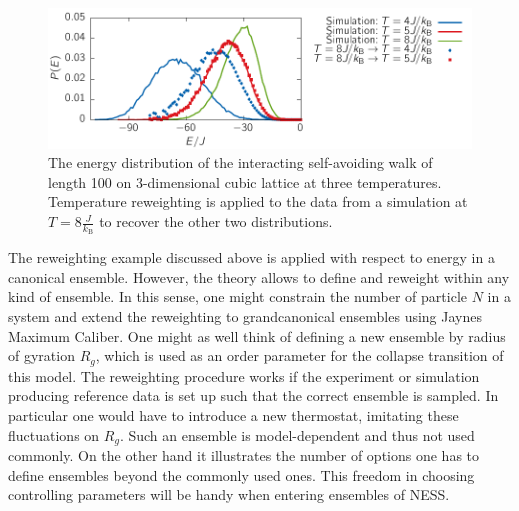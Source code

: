 \begin{figure}

 \includegraphics{../plots/Jaynes/ISAW.pdf}
 \caption[Equilibrium-reweighted energy distribution of the interacting self-avoiding walk.]{The energy distribution of the interacting self-avoiding walk of length 100 on 3-dimensional cubic lattice at three temperatures. Temperature reweighting is applied to the data from a simulation at $T = 8 \frac{J}{k_{\textrm{B}}}  $ to recover the other two distributions. 
 } \label{fig:ISAW}
\end{figure}

The reweighting example discussed above is applied with respect to energy in a canonical ensemble. However, the theory allows to define and reweight within any kind of ensemble. In this sense, one might constrain the number of particle $N$ in a system and extend the reweighting to grandcanonical ensembles using Jaynes Maximum Caliber. One might as well think of defining a new ensemble by radius of gyration $R_g$, which is used as an order parameter for the collapse transition of this model. The reweighting procedure works if the experiment or simulation producing reference data is set up such that the correct ensemble is sampled. In particular one would have to introduce a new thermostat, imitating these fluctuations on $R_g$. Such an ensemble is model-dependent and thus not used commonly. On the other hand it illustrates the number of options one has to define ensembles beyond the commonly used ones. This freedom in choosing controlling parameters will be handy when entering ensembles of NESS. 



